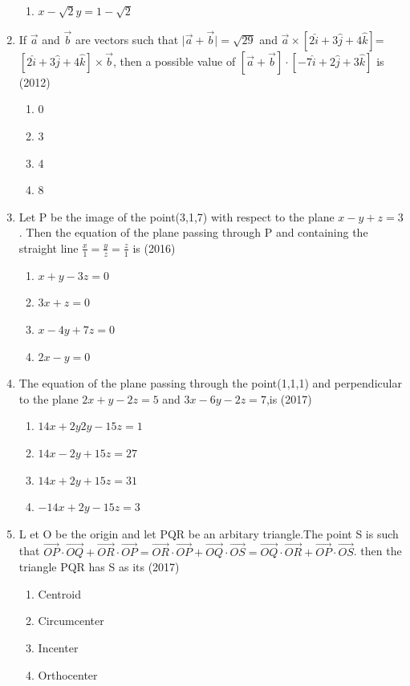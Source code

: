 \documentclass[12pt]{article}
\providecommand{\sbrak}[1]{\ensuremath{{}\left[#1\right]}}
\begin{document}
\begin{enumerate}
\begin{enumerate}
\item $x-\sqrt{2}y=1-\sqrt{2}$
\end{enumerate}
\item If $\vec{a}$ and $\vec{b}$ are vectors such that $\mid \vec{a}+\vec{b} \mid=\sqrt{29}$ and $\vec{a}\times\sbrak{2\hat{i}+3\hat{j}+4\hat{k}}$=$\sbrak{2\hat{i}+3\hat{j}+4\hat{k}}\times\vec{b}$, then a possible value of $\sbrak{\vec{a}+\vec{b}}\cdot\sbrak{-7\hat{i}+2\hat{j}+3\hat{k}}$ is (2012)
\begin{enumerate}
\item 0
\item 3
\item 4
\item 8
\end{enumerate}
\item Let P be the image of the point(3,1,7) with respect to the plane $x-y+z=3$. Then the equation of the plane passing through P and containing the straight line $\frac{x}{1}=\frac{y}{z}=\frac{z}{1}$ is (2016)
\begin{enumerate}
\item $x+y-3z=0$
\item $3x+z=0$
\item $x-4y+7z=0$
\item $2x-y=0$
\end{enumerate}
\item The equation of the plane passing through the point(1,1,1) and perpendicular to the plane $2x+y-2z=5$ and $3x-6y-2z=7$,is (2017)
\begin{enumerate}
\item  $14x+2y2y-15z=1$
\item  $14x-2y+15z=27$
\item  $14x+2y+15z=31$
\item  $-14x+2y-15z=3$
\end{enumerate}
\item L et O be the origin and let PQR be an arbitary triangle.The point S is such that
$\overrightarrow{OP}\cdot\overrightarrow{OQ}+\overrightarrow{OR}\cdot\overrightarrow{OP}=\overrightarrow{OR}\cdot\overrightarrow{OP}+\overrightarrow{OQ}\cdot\overrightarrow{OS}=\overrightarrow{OQ}\cdot\overrightarrow{OR}+\overrightarrow{OP}\cdot\overrightarrow{OS}$. then the triangle PQR has S as its (2017)
\begin{enumerate}
\item Centroid
\item Circumcenter
\item Incenter
\item Orthocenter
\end{enumerate}
\end{enumerate}
\end{document}
